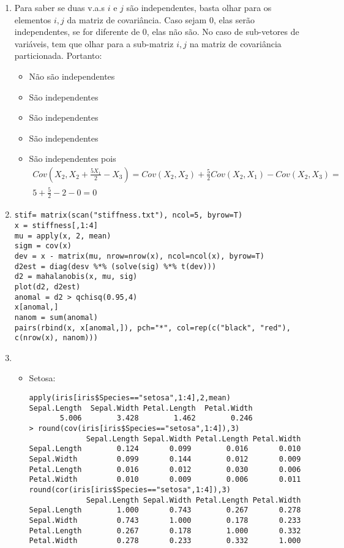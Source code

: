 \documentclass[11pt,a4paper]{book}
\begin{document}
\begin{enumerate}
			\item
			Para saber se duas v.a.s $i$ e $j$ são independentes, basta olhar para os elementos $i,j$ da matriz de covariância.
			Caso sejam 0, elas serão independentes, se for diferente de 0, elas não são.
			No caso de sub-vetores de variáveis, tem que olhar para a sub-matriz $i,j$ na matriz de covariância particionada.
			Portanto:
			\begin{itemize}
			\item Não são independentes
			\item São independentes
			\item São independentes
			\item São independentes
			\item São independentes pois
			\begin{eqnarray*}
			Cov(X_2,X_2+\frac{5X_1}{2}-X_3) = Cov(X_2,X_2)+\frac{5}{2}Cov(X_2,X_1)-Cov(X_2,X_3) =\\ 5+\frac{5}{2}-2-0 = 0
			\end{eqnarray*}
			\end{itemize}
		\item
		\begin{lstlisting}
stif= matrix(scan("stiffness.txt"), ncol=5, byrow=T)
x = stiffness[,1:4]
mu = apply(x, 2, mean)
sigm = cov(x)
dev = x - matrix(mu, nrow=nrow(x), ncol=ncol(x), byrow=T)
d2est = diag(desv %*% (solve(sig) %*% t(dev)))
d2 = mahalanobis(x, mu, sig)
plot(d2, d2est)
anomal = d2 > qchisq(0.95,4)
x[anomal,]
nanom = sum(anomal)
pairs(rbind(x, x[anomal,]), pch="*", col=rep(c("black", "red"), c(nrow(x), nanom)))
		\end{lstlisting}
		\item
		\begin{itemize}
		\item
		Setosa:
		\begin{lstlisting}
apply(iris[iris$Species=="setosa",1:4],2,mean)
Sepal.Length  Sepal.Width Petal.Length  Petal.Width 
       5.006        3.428        1.462        0.246 
> round(cov(iris[iris$Species=="setosa",1:4]),3)
             Sepal.Length Sepal.Width Petal.Length Petal.Width
Sepal.Length        0.124       0.099        0.016       0.010
Sepal.Width         0.099       0.144        0.012       0.009
Petal.Length        0.016       0.012        0.030       0.006
Petal.Width         0.010       0.009        0.006       0.011
round(cor(iris[iris$Species=="setosa",1:4]),3)
             Sepal.Length Sepal.Width Petal.Length Petal.Width
Sepal.Length        1.000       0.743        0.267       0.278
Sepal.Width         0.743       1.000        0.178       0.233
Petal.Length        0.267       0.178        1.000       0.332
Petal.Width         0.278       0.233        0.332       1.000
		\end{lstlisting}
		

\end{itemize}
\end{enumerate}
\end{document}
